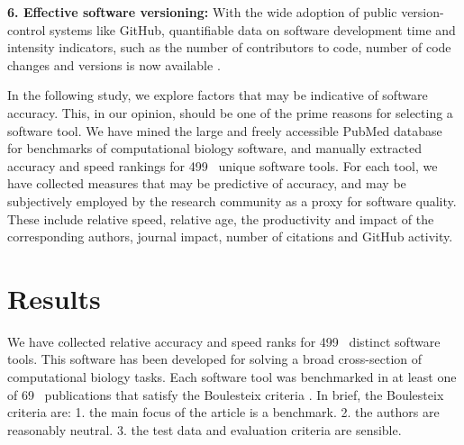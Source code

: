 \documentclass{bmcart}
\def\numTools{499}
\def\numBenchmarkPubs{69}
\begin{document}
{\color{black}\textbf{6. Effective software versioning:} With the wide adoption of
public version-control systems like GitHub, quantifiable data on
software development time and intensity indicators, such as the number
of contributors to code, number of code changes and versions is
now available \cite{ray2014large,Dozmorov:2018,Mangul:2019}.}

In the following study, we explore factors that may be indicative of
software accuracy. This, in our opinion, should be one of the prime
reasons for selecting a software tool. We have mined the large and
freely accessible PubMed database \cite{Sayers2010-vm} for benchmarks
of computational biology software, and manually extracted accuracy and
speed rankings for \numTools~ unique software tools. For
each tool, we have collected measures that may be predictive
of accuracy, and may be subjectively employed by the research
community as a proxy for software quality. These include relative
speed, relative age, the productivity and impact of the corresponding
authors, journal impact, number of citations {\color{black}and GitHub activity}.

\section*{Results}
We have collected relative accuracy and speed ranks for
\numTools~ distinct software tools. This software has
been developed for solving a broad cross-section of computational biology
tasks.
Each software tool was benchmarked in at least one of
\numBenchmarkPubs~ publications that satisfy the Boulesteix
criteria \cite{Boulesteix2013-vb}. In brief, the Boulesteix criteria
are: 1. the main focus of the article is a benchmark. 2. the authors
are reasonably neutral. 3. the test data and evaluation criteria are
sensible.
\end{document}
